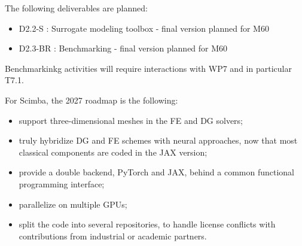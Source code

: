 
The following deliverables are planned:
\begin{itemize}
\item D2.2-S : Surrogate modeling toolbox - final version planned for M60
\item D2.3-BR : Benchmarking - final version planned for M60
\end{itemize}

Benchmarkinkg activities will require interactions with WP7 and in particular T7.1.

For Scimba, the 2027 roadmap is the following:
\begin{itemize}
\item support three-dimensional meshes in the FE and DG solvers;
\item truly hybridize DG and FE schemes with neural approaches, now that
  most classical components are coded in the JAX version;
\item provide a double backend, PyTorch and JAX, behind a common
  functional programming interface;
\item parallelize on multiple GPUs;
\item split the code into several repositories, to handle license
  conflicts with contributions from industrial or academic partners.
\end{itemize}
